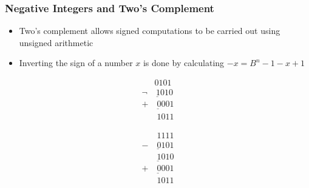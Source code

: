 \documentclass[aspectratio=169]{beamer}
\newif\iftransitions
\begin{document}
\begin{frame}
  \frametitle{Negative Integers and Two's Complement}
  
  \begin{itemize}
  \item Two's complement allows signed computations to be carried out using unsigned arithmetic
  \iftransitions
  \uncover<2->{ \item Inverting the sign of a number $x$ is done by calculating $-x = B^n - 1 - x + 1$ }
  \else
  \item Inverting the sign of a number $x$ is done by calculating $-x = B^n - 1 - x + 1$
  \fi
  \end{itemize}
  
  \begin{multicols}{2}
  \begin{equation*}\begin{array}{c}
   \phantom{999}0101\\
   \underline{\lnot\phantom{99}1010} \\
   \underline{+ \phantom{90}0001} \\
   \phantom{+99}1011
  \end{array}\end{equation*}
  
  \iftransitions \pause \fi 
  
  \begin{equation*}\begin{array}{c}
   \phantom{-99}1111 \\
   \underline{-\phantom{99}0101} \\
   \underline{\phantom{-99}1010} \\
   \underline{+ \phantom{90}0001} \\
   \phantom{+99}1011
  \end{array}\end{equation*}
  \end{multicols}
  
  
  
\end{frame}
\end{document}
